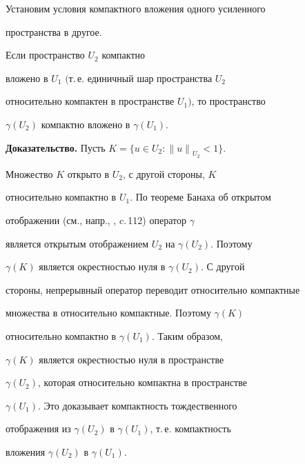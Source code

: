 Установим условия компактного вложения одного усиленного


пространства в другое.





\begin{lems} \label{lcomp}


Если пространство $U_2$ компактно


вложено в $U_1$ $($т.\,е. единичный шар пространства $U_2$


относительно компактен в пространстве $U_1)$, то пространство


$\gamma(U_2)$ компактно вложено в $\gamma(U_1)$.


\end{lems}





{\bf Доказательство.} Пусть $K=\{u \in U_2:{\|u\|}_{U_2} < 1\}$.


Множество $K$ открыто в $U_2$, с другой стороны, $K$


относительно компактно в $U_1$. По теореме Банаха об открытом


отображении (см., напр., \cite{Iosida}, c.\,112) оператор $\gamma$


является открытым отображением $U_2$ на $\gamma(U_2)$. Поэтому


$\gamma(K)$ является окрестностью нуля в $\gamma(U_2)$. С другой


стороны, непрерывный оператор переводит относительно компактные


множества в относительно компактные. Поэтому $\gamma(K)$


относительно компактно в $\gamma(U_1)$. Таким образом,


$\gamma(K)$ является окрестностью нуля в пространстве


$\gamma(U_2)$, которая относительно компактна в пространстве


$\gamma(U_1)$. Это доказывает компактность тождественного


отображения из $\gamma(U_2)$ в $\gamma(U_1)$, т.\,е. компактность


вложения $\gamma(U_2)$ в $\gamma(U_1)$.





